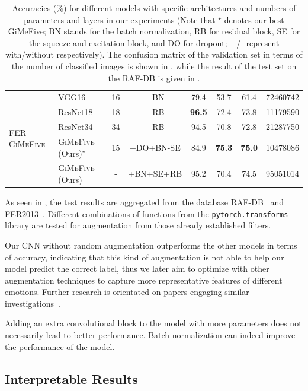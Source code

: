 \begin{table}[ht]
\begin{tabular}{@{}llcccccr@{}}
    \midrule
    \midrule
    \multirow{5}{*}{FER \textsc{GiMeFive}} & VGG16~\cite{SimonyanZ14a} & 16 & +BN & 79.4 & 53.7 & 61.4 & 72460742 \\
    & ResNet18~\cite{HeZRS16} & 18 & +RB  & \textbf{96.5} & 72.4 & 73.8 & 11179590 \\
    & ResNet34~\cite{HeZRS16} & 34 & +RB  & 94.5 & 70.8 & 72.8 & 21287750 \\
    &\textsc{GiMeFive} (Ours)\textcolor{LMUGreen}{$^\star$} & 15 & +DO+BN-SE & 84.9 & \textbf{75.3} & \textbf{75.0} & 10478086 \\
    &\textsc{GiMeFive} (Ours) & - & +BN+SE+RB & 95.2 & 70.4 & 74.5 & 95051014 \\
    \bottomrule
  \end{tabular}
  \caption{Accuracies (\%) for different models with specific architectures and numbers of parameters and layers in our experiments 
  (Note that \textcolor{LMUGreen}{$^\star$} denotes our best GiMeFive; 
  BN stands for the batch normalization, 
  RB for residual block, 
  SE for the squeeze and excitation block, 
  and DO for dropout; 
  +/- represent with/without respectively). 
  The confusion matrix of the validation set in terms of the number of classified images is shown in , 
  while the result of the test set on the RAF-DB is given in .} 
  \label{tab:model}
\end{table}

As seen in , 
the test results are aggregated from the database RAF-DB~\cite{kaggle_rafdb} and FER2013~\cite{kaggle_fer}.
Different combinations of functions from the \texttt{pytorch.transforms} library are tested for augmentation from those already established filters. 

Our CNN without random augmentation outperforms the other models in terms of accuracy, 
indicating that this kind of augmentation is not able to help our model predict the correct label, 
thus we later aim to optimize with other augmentation techniques to capture more representative features of different emotions.
Further research is orientated on papers engaging similar investigations~\cite{ZeilerF14,li_reliable_2017,VermaMRMV23}.

Adding an extra convolutional block to the model with more parameters does not necessarily lead to better performance.
Batch normalization can indeed improve the performance of the model. 


\subsection{Interpretable Results}
\label{sec:evaluation:inter}

